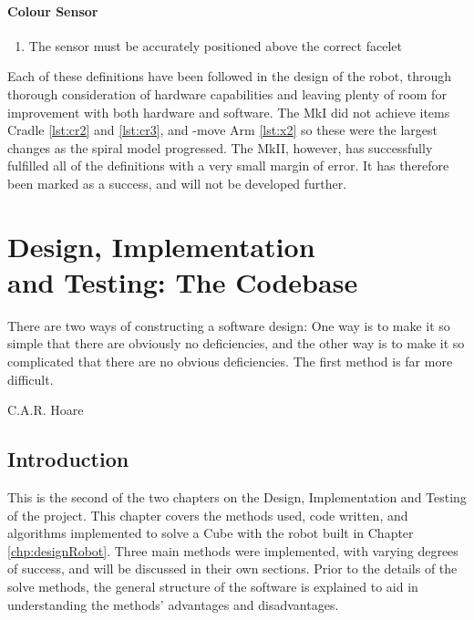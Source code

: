 \documentclass{report}
\newcommand{\move}[1]{\uppercase{\texttt{\formatmovesnospace{#1}}}-move}
\begin{document}
	\subsubsection{Colour Sensor}
	
	\begin{enumerate}
		\item The sensor must be accurately positioned above the correct facelet \label{lst:cs1}
	\end{enumerate}

	Each of these definitions have been followed in the design of the robot, through thorough consideration of hardware capabilities and leaving plenty of room for improvement with both hardware and software. The MkI did not achieve items Cradle \ref{lst:cr2} and \ref{lst:cr3}, and \move{x} Arm \ref{lst:x2} so these were the largest changes as the spiral model progressed. The MkII, however, has successfully fulfilled all of the definitions with a very small margin of error. It has therefore been marked as a success, and will not be developed further.
    
    \newpage
    
    \chapter[Design, Implementation and Testing: The Codebase]{Design, Implementation \\ and Testing: The Codebase}
    \epigraph{There are two ways of constructing a software design: One way is to make it so simple that there are obviously no deficiencies, and the other way is to make it so complicated that there are no obvious deficiencies. The first method is far more difficult.}{C.A.R. Hoare \cite{Hoare1981}}
    
    \section{Introduction}
    
	This is the second of the two chapters on the Design, Implementation and Testing of the project. This chapter covers the methods used, code written, and algorithms implemented to solve a Cube with the robot built in Chapter \ref{chp:designRobot}. Three main methods were implemented, with varying degrees of success, and will be discussed in their own sections. Prior to the details of the solve methods, the general structure of the software is explained to aid in understanding the methods' advantages and disadvantages.
    
\end{document}
